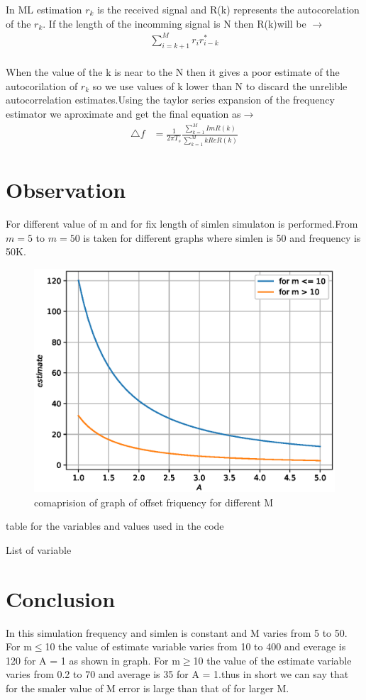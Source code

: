 	In ML estimation $r_k$ is the received signal and R(k) represents the autocorelation of the  $r_k$. If the length of the incomming signal is N then R(k)will be $\to$
	\\
	\begin{align}
		{\sum_{i = k+1}^{M} r_ir_{i-k}^*}
	\end{align}
	\\
	When the value of the k is near to the N then it gives a poor estimate of the autocorilation of $r_k$ so we use values of k lower than N to discard the unrelible autocorrelation estimates.Using the taylor series expansion of the frequency estimator we  aproximate  and get the final equation as$\to$ 
	\\
	\begin{align}
	\triangle f &= \frac{1}{2\pi T_s}\frac{\sum_{k=1}^{M} Im{R(k)}}{\sum_{k=1}^{M} kRe{R(k)}}
	\end{align}	

\section{Observation}

	
	For different value of m and for fix length of simlen simulaton is performed.From $m =5$ to $m= 50$ is taken for  different graphs where simlen is 50 and frequency is 50K.

\begin{figure}[!ht]
	\centering
	\includegraphics[width=0.5\columnwidth]{./comparision/frequency.eps}
	\caption{comaprision of graph of offset friquency for different M }
	\label{fig:offset frequency}
\end{figure}
table for the variables and values used in the code
\begin{table}[!ht]
	
	\caption{List of variable }
\end{table}

\section{Conclusion}
	 In this simulation frequency and simlen is constant and M varies from 5 to 50. For  m$\leq$10  the value of  estimate variable  varies from 10 to 400 and everage is 120 for A = 1 as shown in graph. For m$\geq$10  the value of the estimate variable  varies from 0.2 to 70 and average is 35 for A = 1.thus in short we can say that for the smaler value of M error is large than that of for larger M.


